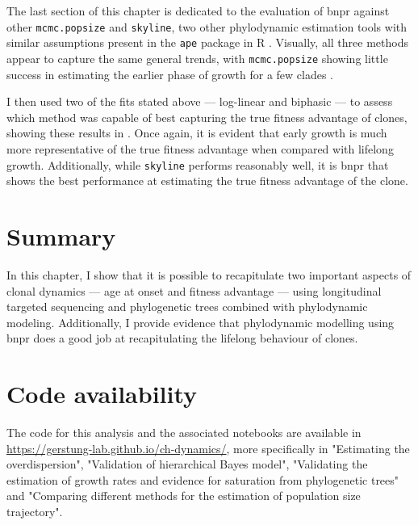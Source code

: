 The last section of this chapter is dedicated to the evaluation of \ac{bnpr} against other \texttt{mcmc.popsize} and \texttt{skyline}, two other phylodynamic estimation tools with similar assumptions present in the \texttt{ape} package in R \cite{Paradis2019-na}. Visually, all three methods appear to capture the same general trends, with \texttt{mcmc.popsize} showing little success in estimating the earlier phase of growth for a few clades .

\begin{figure}[h]
	\label{fig:compare-phylo-traj}
\end{figure}

I then used two of the fits stated above --- log-linear and biphasic --- to assess which method was capable of best capturing the true fitness advantage of clones, showing these results in . Once again, it is evident that early growth is much more representative of the true fitness advantage when compared with lifelong growth. Additionally, while \texttt{skyline} performs reasonably well, it is \ac{bnpr} that shows the best performance at estimating the true fitness advantage of the clone.

\begin{figure}[h]
	\label{fig:compare-phylo-traj-heatmap}
\end{figure}

\section{Summary}

In this chapter, I show that it is possible to recapitulate two important aspects of clonal dynamics --- age at onset and fitness advantage --- using longitudinal targeted sequencing and phylogenetic trees combined with phylodynamic modeling. Additionally, I provide evidence that phylodynamic modelling using \ac{bnpr} does a good job at recapitulating the lifelong behaviour of clones.

\section{Code availability}

The code for this analysis and the associated notebooks are available in \url{https://gerstung-lab.github.io/ch-dynamics/}, more specifically in "Estimating the overdispersion", "Validation of hierarchical Bayes model", "Validating the estimation of growth rates and evidence for saturation from phylogenetic trees" and "Comparing different methods for the estimation of population size trajectory".